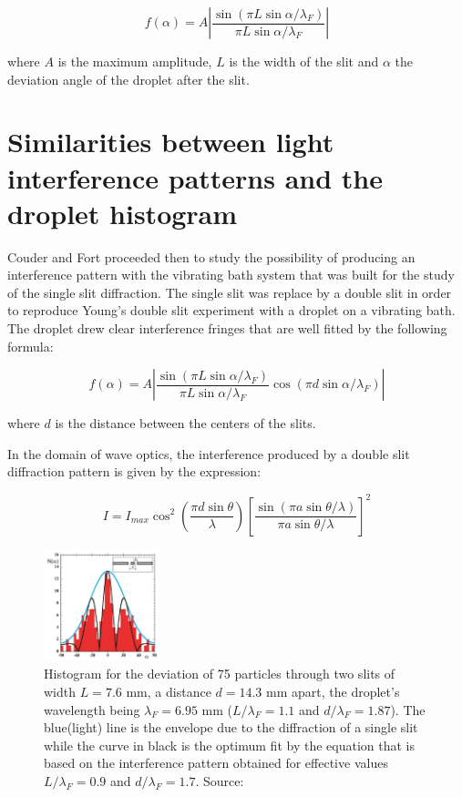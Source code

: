 \documentclass[
 reprint,
 amsmath,amssymb,
pra,
]{revtex4-1}
\begin{document}
    $$ f(\alpha) = A \left|\frac{\sin{(\pi L \sin{\alpha}/\lambda_F)}}{\pi L \sin{\alpha}/\lambda_F}\right|$$

    where $A$ is the maximum amplitude, $L$ is the width of the slit and $\alpha$ the deviation angle of the droplet after the slit.


\section{Similarities between light interference patterns and the droplet histogram}

	Couder and Fort proceeded then to study the possibility of producing an interference pattern with the vibrating bath system that was built for the study of the single slit diffraction. The single slit was replace by a double slit in order to reproduce Young's double slit experiment with a droplet on a vibrating bath. The droplet drew clear interference fringes that are well fitted by the following formula:

	$$f(\alpha)=A \left|\frac{\sin{(\pi L \sin{\alpha}/\lambda_F)}}{\pi L \sin{\alpha}/\lambda_F} \cos{(\pi d \sin{\alpha}/\lambda_F)}\right|$$

	where $d$ is the distance between the centers of the slits.

	In the domain of wave optics, the interference produced by a double slit diffraction pattern is given by the expression:

	$$I=I_{max} \cos ^2 \left(\frac{\pi d \sin \theta}{\lambda}\right) \left[ \frac{\sin (\pi a \sin \theta / \lambda)}{\pi a \sin \theta / \lambda}\right]^2$$

	\begin{figure}
		\includegraphics[width=0.30\textwidth]{img3.png}
		\caption{Histogram for the deviation of 75 particles through two slits of width $L = 7.6$ mm, a distance $d = 14.3$ mm apart, the droplet's wavelength being $\lambda_F = 6.95$ mm ($L/\lambda_F = 1.1$ and $d/\lambda_F = 1.87$). The blue(light) line is the envelope due to the diffraction of a single slit while the curve in black is the optimum fit by the equation that is based on the interference pattern obtained for effective values $L/\lambda_F = 0.9$ and $d/\lambda_F = 1.7$. Source:\cite{couder_single-particle_2006}}
		\label{fig:interference}
	\end{figure}
\end{document}

